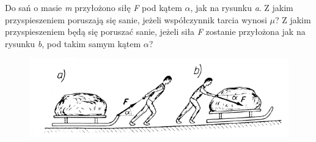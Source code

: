 Do sań o masie \emph{m} przyłożono siłę \emph{F} pod kątem \emph{$\alpha$}, jak na rysunku \emph{a}. Z jakim przyspieszeniem poruszają się sanie, jeżeli współczynnik tarcia wynosi \emph{$\mu$}? Z jakim przyspieszeniem będą się poruszać sanie, jeżeli siła \emph{F} zostanie przyłożona jak na rysunku \emph{b}, pod takim samym kątem \emph{$\alpha$}?
\begin{figure}[H]
	\centering
	\includegraphics[width=0.45\linewidth]{../rysunki/dynamika/sanki-tarcie}
\end{figure}

